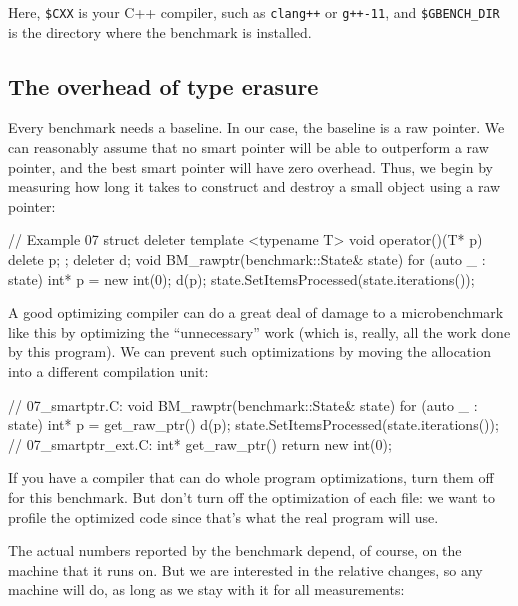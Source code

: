 {

Here, \texttt{\$CXX} is your C++ compiler, such as \texttt{clang++} or \texttt{g++-11}, and \texttt{\$GBENCH\_DIR} is the directory where the benchmark is installed.

\subsection{The overhead of type erasure}

Every benchmark needs a baseline. In our case, the baseline is a raw pointer. We can reasonably assume that no smart pointer will be able to outperform a raw pointer, and the best smart pointer will have zero overhead. Thus, we begin by measuring how long it takes to construct and destroy a small object using a raw pointer:

\begin{code}
// Example 07
struct deleter {
  template <typename T> void operator()(T* p) { delete p; }
};
deleter d;
void BM_rawptr(benchmark::State& state) {
  for (auto _ : state) {
    int* p = new int(0);
    d(p);
  }
  state.SetItemsProcessed(state.iterations());
}
\end{code}

A good optimizing compiler can do a great deal of damage to a microbenchmark like this by optimizing the ``unnecessary'' work (which is, really, all the work done by this program). We can prevent such optimizations by moving the allocation into a different compilation unit:

\begin{code}
// 07_smartptr.C:
void BM_rawptr(benchmark::State& state) {
  for (auto _ : state) {
    int* p = get_raw_ptr()
    d(p);
  }
  state.SetItemsProcessed(state.iterations());
}
// 07_smartptr_ext.C:
int* get_raw_ptr() { return new int(0); }
\end{code}

If you have a compiler that can do whole program optimizations, turn them off for this benchmark. But don't turn off the optimization of each file: we want to profile the optimized code since that's what the real program will use.

The actual numbers reported by the benchmark depend, of course, on the machine that it runs on. But we are interested in the relative changes, so any machine will do, as long as we stay with it for all measurements:

}
